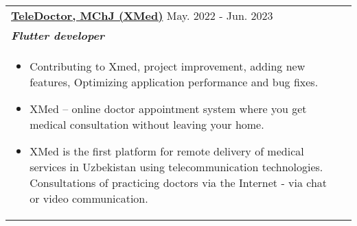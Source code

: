 \documentclass[a4paper,8pt]{article}
\begin{document}
\begin{tabularx}{\linewidth}{ @{}l r@{} }
\textbf{\uline{{TeleDoctor, MChJ (XMed)}}} \hfill \color[HTML]{371e77} May. 2022 - Jun. 2023 \\[4pt]
\color[HTML]{371e77}\textbf{\textit{Flutter developer}}\ \hfill \color[HTML]{4B28A4} \textit{
} \\[5pt]
\begin{minipage}[t]{\linewidth}
    \begin{itemize}[nosep,after=\strut, leftmargin=2em, itemsep=2pt]
        \item Contributing to Xmed, project improvement, adding new features, Optimizing application performance and bug fixes.
        \item XMed – online doctor appointment system where you get medical consultation without leaving your home.
        \item XMed is the first platform for remote delivery of medical services in Uzbekistan using telecommunication technologies. Consultations of practicing doctors via the Internet - via chat or video communication.
    \end{itemize}
\end{minipage}
\end{tabularx}


\end{document}
